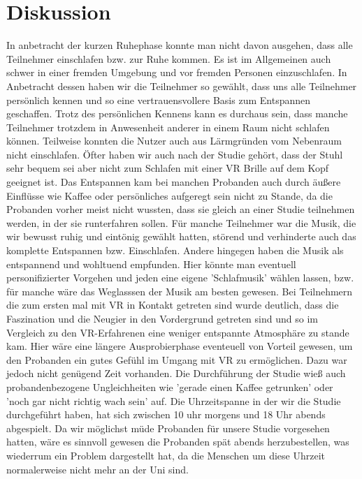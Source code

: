 \chapter{Diskussion}

In anbetracht der kurzen Ruhephase konnte man nicht davon ausgehen, dass alle Teilnehmer einschlafen bzw. zur Ruhe kommen. Es ist im Allgemeinen auch schwer in einer fremden Umgebung und vor fremden Personen einzuschlafen. In Anbetracht dessen haben wir die Teilnehmer so gewählt, dass uns alle Teilnehmer persönlich kennen und so eine vertrauensvollere Basis zum Entspannen geschaffen. Trotz des persönlichen Kennens kann es durchaus sein, dass manche Teilnehmer trotzdem in Anwesenheit anderer in einem Raum nicht schlafen können. Teilweise konnten die Nutzer auch aus Lärmgründen vom Nebenraum nicht einschlafen. Öfter haben wir auch nach der Studie gehört, dass der Stuhl sehr bequem sei aber nicht zum Schlafen mit einer VR Brille auf dem Kopf geeignet ist. Das Entspannen kam bei manchen Probanden auch durch äußere Einflüsse wie Kaffee oder persönliches aufgeregt sein nicht zu Stande, da die Probanden vorher meist nicht wussten, dass sie gleich an einer Studie teilnehmen werden, in der sie runterfahren sollen. 
Für manche Teilnehmer war die Musik, die wir bewusst ruhig und eintönig gewählt hatten, störend und verhinderte auch das komplette Entspannen bzw. Einschlafen. Andere hingegen haben die Musik als entspannend und wohltuend empfunden. Hier könnte man eventuell personifizierter Vorgehen und jeden eine eigene 'Schlafmusik' wählen lassen, bzw. für manche wäre das Weglasssen der Musik am besten gewesen.
Bei Teilnehmern die zum ersten mal mit VR in Kontakt getreten sind wurde deutlich, dass die Faszination und die Neugier in den Vordergrund getreten sind und so im Vergleich zu den VR-Erfahrenen eine weniger entspannte Atmosphäre zu stande kam. Hier wäre eine längere Ausprobierphase eventeuell von Vorteil gewesen, um den Probanden ein gutes Gefühl im Umgang mit VR zu ermöglichen. Dazu war jedoch nicht genügend Zeit vorhanden.
Die Durchführung der Studie wieß auch probandenbezogene Ungleichheiten wie 'gerade einen Kaffee getrunken' oder 'noch gar nicht richtig wach sein' auf. Die Uhrzeitspanne in der wir die Studie durchgeführt haben, hat sich zwischen 10 uhr morgens und 18 Uhr abends abgespielt. Da wir möglichst müde Probanden für unsere Studie vorgesehen hatten, wäre es sinnvoll gewesen die Probanden spät abends herzubestellen, was wiederrum ein Problem dargestellt hat, da die Menschen um diese Uhrzeit normalerweise nicht mehr an der Uni sind.

